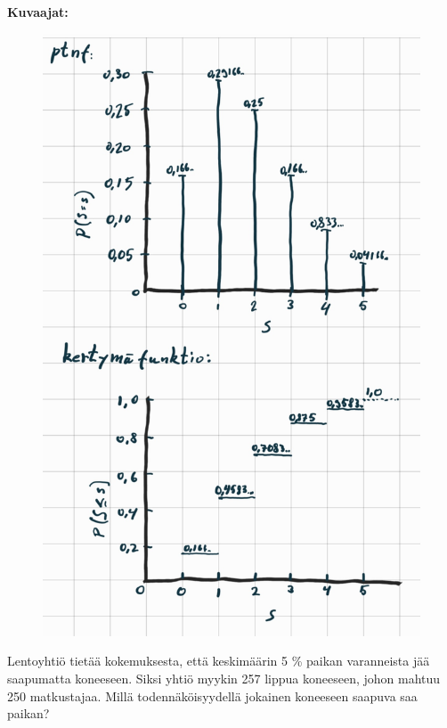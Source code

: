 \documentclass[12pt,a4paper]{article}
\begin{document}
\textbf{Kuvaajat:}


\begin{figure}[h]
  \centering
  \includegraphics[width=.6\textwidth]{viikko3tehtävä5.jpg}
\end{figure}






\pagebreak
{}
Lentoyhtiö tietää kokemuksesta, että keskimäärin 5 \% paikan varanneista jää saapumatta
koneeseen. Siksi yhtiö myykin 257 lippua koneeseen, johon mahtuu 250 matkustajaa. Millä
todennäköisyydellä jokainen koneeseen saapuva saa paikan?\\
\end{document}
